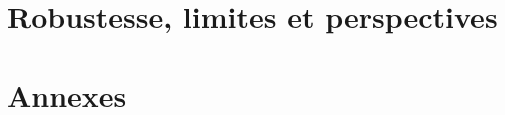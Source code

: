 \documentclass[11pt,a4paper]{report}
\begin{document}
\part{Robustesse, limites et perspectives}
\label{part:limites}

\appendix
\part*{Annexes}


{\NoAutoSpacing}
\end{document}
